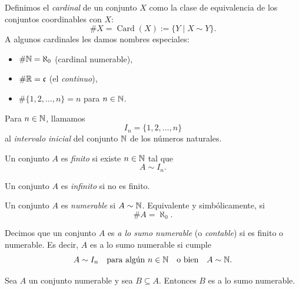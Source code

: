 \begin{defi}
Definimos el \emph{cardinal} de un conjunto $X$ como la clase de
equivalencia de los conjuntos coordinables con $X$:
\[
\#X = \operatorname{Card}(X)
:= \{ Y \mid X \sim Y \}.
\]
A algunos cardinales les damos nombres especiales:
\begin{itemize}
    \item $\#\mathbb{N} = \aleph_0$ (cardinal numerable),
    \item $\#\mathbb{R} = \mathfrak{c}$ (el \emph{continuo}),
    \item $\#\{1,2,\dots,n\} = n$ para $n \in \mathbb{N}$.
\end{itemize}
\end{defi}

\begin{defi}
Para $n \in \mathbb{N}$, llamamos
\[
I_n = \{1,2,\dots,n\}
\]
al \emph{intervalo inicial} del conjunto $\mathbb{N}$ de los números naturales.
\end{defi}

\begin{defi}
Un conjunto $A$ es \emph{finito} si existe $n \in \mathbb{N}$ tal que
\[
A \sim I_n.
\]
\end{defi}

\begin{defi}
Un conjunto $A$ es \emph{infinito} si no es finito.
\end{defi}

\begin{defi}
Un conjunto $A$ es \emph{numerable} si $A \sim \mathbb{N}$.
Equivalente y simbólicamente, si
\[
\#A = \aleph_0.
\]
\end{defi}
\begin{defi}
Decimos que un conjunto $A$ es \emph{a lo sumo numerable}
(o \emph{contable}) si es finito o numerable. Es decir,
$A$ es a lo sumo numerable si cumple
\[
A \sim I_n \quad \text{para algún } n \in \mathbb{N}
\quad \text{o bien} \quad
A \sim \mathbb{N}.
\]
\end{defi}

\begin{prop}
Sea $A$ un conjunto numerable y sea $B \subseteq A$.
Entonces $B$ es a lo sumo numerable.
\end{prop}


